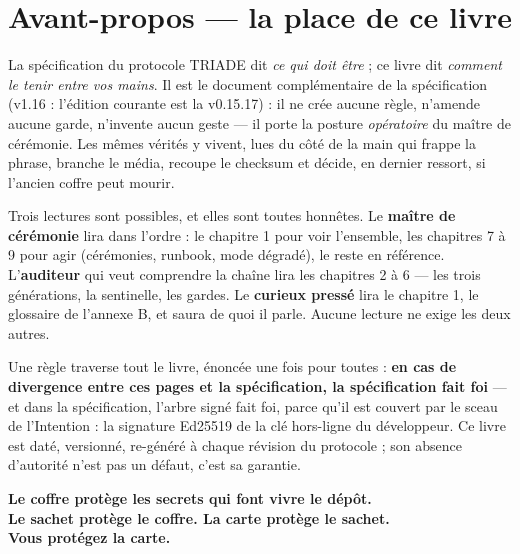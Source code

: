 \section*{Avant-propos — la place de ce livre}\label{sec:avantpropos}


La spécification du protocole TRIADE dit \emph{ce qui doit être} ; ce livre dit
\emph{comment le tenir entre vos mains}. Il est le document complémentaire de la
spécification (v1.16 : l'édition courante est la v0.15.17) : il ne crée aucune règle,
n'amende aucune garde, n'invente aucun geste
— il porte la posture \emph{opératoire} du maître de cérémonie. Les mêmes vérités y
vivent, lues du côté de la main qui frappe la phrase, branche le média, recoupe le
checksum et décide, en dernier ressort, si l'ancien coffre peut mourir.

Trois lectures sont possibles, et elles sont toutes honnêtes. Le \textbf{maître de
cérémonie} lira dans l'ordre : le chapitre 1 pour voir l'ensemble, les chapitres 7 à 9
pour agir (cérémonies, runbook, mode dégradé), le reste en référence. L'\textbf{auditeur}
qui veut comprendre la chaîne lira les chapitres 2 à 6 — les trois générations, la
sentinelle, les gardes. Le \textbf{curieux pressé} lira le chapitre 1, le glossaire de
l'annexe B, et saura de quoi il parle. Aucune lecture ne exige les deux autres.

Une règle traverse tout le livre, énoncée une fois pour toutes : \textbf{en cas de
divergence entre ces pages et la spécification, la spécification fait foi} — et dans la
spécification, l'arbre signé  fait foi, parce qu'il est couvert par le
sceau de l'Intention : la signature Ed25519 de la clé hors-ligne du développeur. Ce
livre est daté, versionné, re-généré à chaque révision du protocole ; son absence
d'autorité n'est pas un défaut, c'est sa garantie.

\bigskip

\begin{center}
\large\bfseries Le coffre protège les secrets qui font vivre le dépôt.\\
Le sachet protège le coffre. La carte protège le sachet.\\
Vous protégez la carte.
\end{center}


